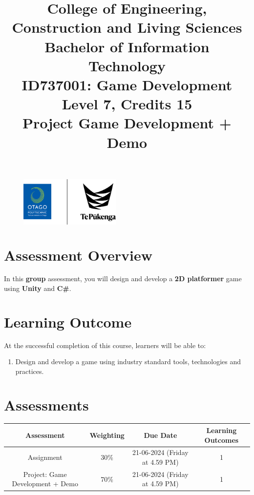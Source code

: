 \documentclass{article}
\author{}
\begin{document}
\begin{figure}
	\centering
	\includegraphics[width=50mm]{../../resources/img/logo.png}
\end{figure}

\title{College of Engineering, Construction and Living Sciences\\Bachelor of Information Technology\\ID737001: Game Development\\Level 7, Credits 15\\\textbf{Project Game Development + Demo}}
\date{}
\maketitle

\section*{Assessment Overview}
In this \textbf{group} assessment, you will design and develop a \textbf{2D platformer} game using \textbf{Unity} and \textbf{C\#}. 

\section*{Learning Outcome}
At the successful completion of this course, learners will be able to:
\begin{enumerate}
	\item Design and develop a game using industry standard tools, technologies and practices.
\end{enumerate}

\section*{Assessments}
\renewcommand{\arraystretch}{1.5}
\begin{tabular}{|c|c|c|c|}
	\hline
	\textbf{Assessment}                                 & \textbf{Weighting} & \textbf{Due Date}            & \textbf{Learning Outcomes} \\ \hline
	\small Assignment  & \small 30\%        & \small 21-06-2024 (Friday at 4.59 PM)   & \small 1                  \\ \hline
	\small Project: Game Development + Demo & \small 70\%        & \small 21-06-2024 (Friday at 4.59 PM)   & \small 1                   \\ \hline
\end{tabular} 
\end{document}
